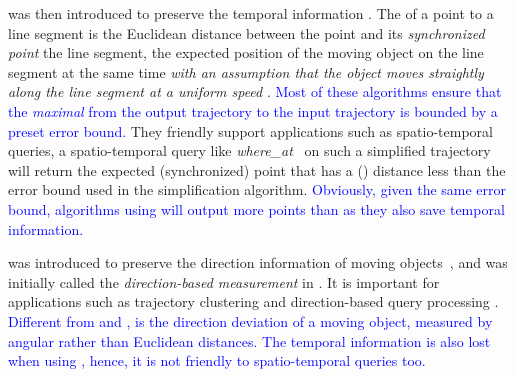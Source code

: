 { \sed was then introduced to preserve the temporal information \cite{Meratnia:Spatiotemporal,Cao:Spatio}.
The \sed of a point to a line segment is the Euclidean distance between the point and its \emph{synchronized point} \wrt the line segment, the expected position of the moving object on the line segment at the same time \emph{with an assumption that the object moves straightly along the line segment at a uniform speed} \cite{Cao:Spatio}. \textcolor{blue}{Most of these algorithms ensure that the \emph{maximal} \sed from the output trajectory to the input trajectory is bounded by a preset \sed error bound.}
They friendly support applications such as spatio-temporal queries, \ie a spatio-temporal query like \emph{where\_at}~\cite{Cao:Spatio} on such a simplified trajectory will return the expected (synchronized) point that has a (\sed) distance less than the error bound used in the simplification algorithm.
\textcolor{blue}{Obviously, given the same error bound, algorithms using \sed will output more points than \ped as they also save temporal information.}
%



\dad was introduced to preserve the direction information of moving objects~\cite{Long:Direction, Zhang:Evaluation}, and was initially called the \emph{direction-based measurement} in \cite{Long:Direction}.
It is important for applications such as trajectory clustering and direction-based query processing \cite{Long:Direction,Long:Mining}.
\textcolor{blue}{Different from \ped and \sed, \dad is the direction deviation of a moving object, measured by angular rather than Euclidean distances.}
\textcolor{blue}{The temporal information is also lost when using \dad, hence, it is not friendly to spatio-temporal queries too.}



}
